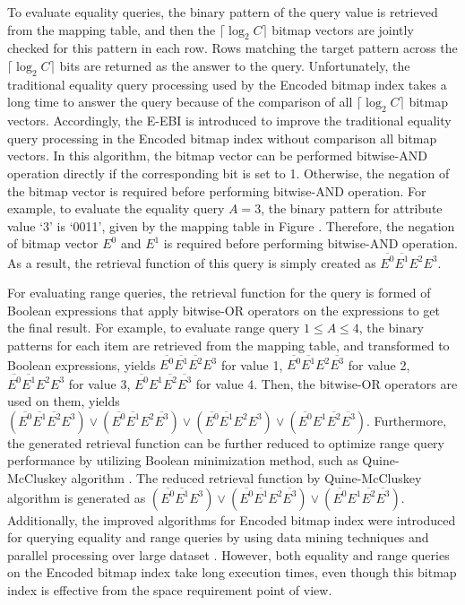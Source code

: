 \documentclass[../main/thesis.tex]{subfiles}
\begin{document}
To evaluate equality queries, the binary pattern of the query value is retrieved from the mapping table, and then the $\lceil\log_2 C\rceil$ bitmap vectors are jointly checked for this pattern in each row. Rows matching the target pattern across the $\lceil\log_2 C\rceil$ bits are returned as the answer to the query. Unfortunately, the traditional equality query processing used by the Encoded bitmap index takes a long time to answer the query because of the comparison of all $\lceil\log_2 C\rceil$ bitmap vectors. Accordingly, the E-EBI \cite{EEBI} is introduced to improve the traditional equality query processing in the Encoded bitmap index without comparison all bitmap vectors. In this algorithm, the bitmap vector can be performed bitwise-AND operation directly if the corresponding bit is set to 1. Otherwise, the negation of the bitmap vector is required before performing bitwise-AND operation. For example, to evaluate the equality query $A=3$, the binary pattern for attribute value `3' is `0011', given by the mapping table in Figure .   Therefore, the negation of bitmap vector $E^0$ and $E^1$ is required before performing bitwise-AND operation. As a result, the retrieval function of this query is simply created as $\overline{E^0}\overline{E^1}E^2E^3$.

For evaluating range queries, the retrieval function for the query is formed of Boolean expressions that apply bitwise-OR operators on the expressions to get the final result. For example, to evaluate range query $1\leq A \leq 4$, the binary patterns for each item are retrieved from the mapping table, and transformed to Boolean expressions, yields $\overline{E^0}\overline{E^1}\overline{E^2}E^3$ for value 1, $\overline{E^0}\overline{E^1}E^2\overline{E^3}$ for value 2,
$\overline{E^0}\overline{E^1}E^2 E^3$ for value 3,
$\overline{E^0}E^1\overline{E^2}\overline{E^3}$ for value 4. Then, the bitwise-OR operators are used on them, yields $(\overline{E^0}\overline{E^1}\overline{E^2}E^3) \vee (\overline{E^0}\overline{E^1}E^2\overline{E^3}) \vee (\overline{E^0}\overline{E^1}E^2 E^3) \vee (\overline{E^0}E^1\overline{E^2}\overline{E^3})$. Furthermore, the generated retrieval function can be further reduced to optimize range query performance by utilizing Boolean minimization method, such as Quine-McCluskey algorithm \cite{Quine1952,Mccluskey1956}. The reduced retrieval function by Quine-McCluskey algorithm is generated as $(\overline{E^0}\overline{E^1} E^3) \vee (\overline{E^0}\overline{E^1}E^2\overline{E^3}) \vee (\overline{E^0}E^1\overline{E^2}\overline{E^3})$. Additionally, the improved algorithms for Encoded bitmap index were introduced for querying equality and range queries by using data mining techniques and parallel processing over large dataset \cite{ApioriEncoded, FIEncoded, EEBI, DistEQ}. However, both equality and range queries on the Encoded bitmap index take long execution times, even though this bitmap index is effective from the space requirement point of view.
\end{document}
